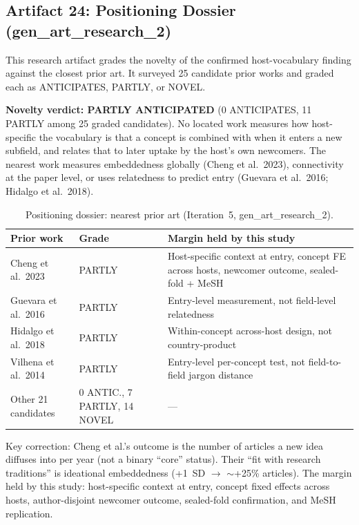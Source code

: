 \documentclass[11pt,letterpaper]{article}
\begin{document}
\subsection{Artifact 24: Positioning Dossier (gen\_art\_research\_2)}

This research artifact grades the novelty of the confirmed host-vocabulary finding against the closest prior art. It surveyed 25 candidate prior works and graded each as ANTICIPATES, PARTLY, or NOVEL.

\textbf{Novelty verdict: PARTLY ANTICIPATED} (0 ANTICIPATES, 11 PARTLY among 25 graded candidates). No located work measures how host-specific the vocabulary is that a concept is combined with when it enters a new subfield, and relates that to later uptake by the host's own newcomers. The nearest work measures embeddedness globally (Cheng et al.\ 2023), connectivity at the paper level, or uses relatedness to predict entry (Guevara et al.\ 2016; Hidalgo et al.\ 2018).

\begin{table}[!htbp]
\centering
\caption{Positioning dossier: nearest prior art (Iteration~5, gen\_art\_research\_2).}
\label{tab:positioning}
{\footnotesize
\begin{tabular}{L{3.5cm}L{1.5cm}L{5cm}}
\toprule
Prior work & Grade & Margin held by this study \\
\midrule
Cheng et al.\ 2023 & PARTLY & Host-specific context at entry, concept FE across hosts, newcomer outcome, sealed-fold + MeSH \\
Guevara et al.\ 2016 & PARTLY & Entry-level measurement, not field-level relatedness \\
Hidalgo et al.\ 2018 & PARTLY & Within-concept across-host design, not country-product \\
Vilhena et al.\ 2014 & PARTLY & Entry-level per-concept test, not field-to-field jargon distance \\
Other 21 candidates & 0 ANTIC., 7 PARTLY, 14 NOVEL & --- \\
\bottomrule
\end{tabular}
}
\end{table}

Key correction: Cheng et al.'s outcome is the number of articles a new idea diffuses into per year (not a binary ``core'' status). Their ``fit with research traditions'' is ideational embeddedness (+1~SD $\to$ ${\sim}$+25\% articles). The margin held by this study: host-specific context at entry, concept fixed effects across hosts, author-disjoint newcomer outcome, sealed-fold confirmation, and MeSH replication.
\end{document}
